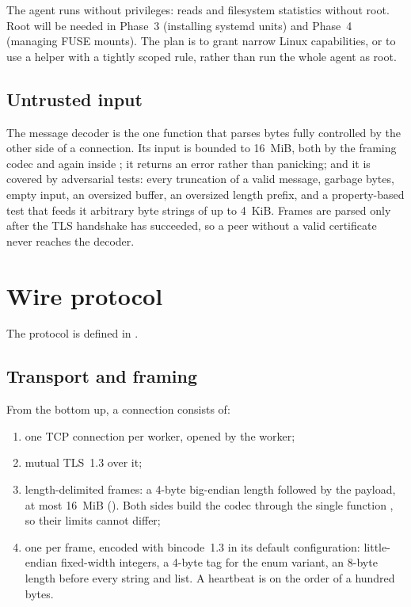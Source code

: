 \documentclass{article}
\begin{document}
The agent runs without privileges:  reads  and
filesystem statistics without root. Root will be needed in Phase~3
(installing systemd units) and Phase~4 (managing FUSE mounts). The plan is
to grant narrow Linux capabilities, or to use a helper with a tightly
scoped  rule, rather than run the whole agent as root.

\subsection{Untrusted input}

The message decoder is the one function that parses bytes fully
controlled by the other side of a connection. Its input is bounded to
16~MiB, both by the framing codec and again inside
; it returns an error rather than panicking; and it
is covered by adversarial tests: every truncation of a valid message,
garbage bytes, empty input, an oversized buffer, an oversized length
prefix, and a property-based test that feeds it arbitrary byte strings
of up to 4~KiB. Frames are parsed only after the TLS handshake has
succeeded, so a peer without a valid certificate never reaches the
decoder.

\section{Wire protocol}

The protocol is defined in .

\subsection{Transport and framing}
\label{sec:transport}

From the bottom up, a connection consists of:

\begin{enumerate}
  \item one TCP connection per worker, opened by the worker;
  \item mutual TLS~1.3 over it;
  \item length-delimited frames: a 4-byte big-endian length followed by
    the payload, at most 16~MiB (). Both sides build
    the codec through the single function
    , so their limits cannot differ;
  \item one  per frame, encoded with bincode~1.3 in its
    default configuration: little-endian fixed-width integers, a 4-byte
    tag for the enum variant, an 8-byte length before every string and
    list. A heartbeat is on the order of a hundred bytes.
\end{enumerate}
\end{document}
